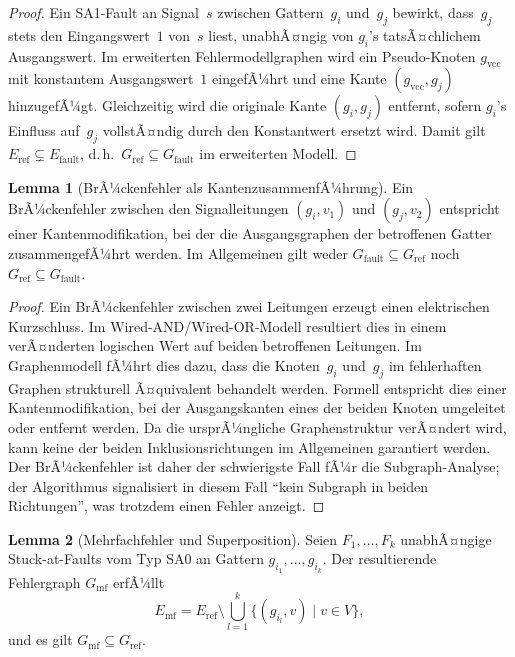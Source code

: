 ﻿\documentclass[a4paper,12pt]{article}
\theoremstyle{definition}
\newtheorem{lemma}{Lemma}
\begin{document}
\begin{proof}
  Ein SA1-Fault an Signal~$s$ zwischen Gattern~$g_i$ und~$g_j$ bewirkt,
  dass~$g_j$ stets den Eingangswert~$1$ von~$s$ liest, unabhÃ¤ngig von
  $g_i$'s tatsÃ¤chlichem Ausgangswert.
  Im erweiterten Fehlermodellgraphen wird ein Pseudo-Knoten
  $g_{\mathrm{vcc}}$ mit konstantem Ausgangswert~$1$ eingefÃ¼hrt und
  eine Kante $(g_{\mathrm{vcc}}, g_j)$ hinzugefÃ¼gt.
  Gleichzeitig wird die originale Kante $(g_i, g_j)$ entfernt, sofern
  $g_i$'s Einfluss auf~$g_j$ vollstÃ¤ndig durch den Konstantwert ersetzt
  wird.
  Damit gilt $E_{\mathrm{ref}} \subsetneq E_{\mathrm{fault}}$, d.\,h.\
  $G_{\mathrm{ref}} \subseteq G_{\mathrm{fault}}$ im erweiterten Modell.
\end{proof}

\begin{lemma}[BrÃ¼ckenfehler als KantenzusammenfÃ¼hrung]
  \label{lem:bridge_edge}
  Ein BrÃ¼ckenfehler zwischen den Signalleitungen $(g_i, v_1)$ und
  $(g_j, v_2)$ entspricht einer Kantenmodifikation, bei der die
  Ausgangsgraphen der betroffenen Gatter zusammengefÃ¼hrt werden.
  Im Allgemeinen gilt weder $G_{\mathrm{fault}} \subseteq G_{\mathrm{ref}}$
  noch $G_{\mathrm{ref}} \subseteq G_{\mathrm{fault}}$.
\end{lemma}

\begin{proof}
  Ein BrÃ¼ckenfehler zwischen zwei Leitungen erzeugt einen elektrischen
  Kurzschluss.
  Im Wired-AND/Wired-OR-Modell resultiert dies in einem verÃ¤nderten
  logischen Wert auf beiden betroffenen Leitungen.
  Im Graphenmodell fÃ¼hrt dies dazu, dass die Knoten~$g_i$ und~$g_j$
  im fehlerhaften Graphen strukturell Ã¤quivalent behandelt werden.
  Formell entspricht dies einer Kantenmodifikation, bei der
  Ausgangskanten eines der beiden Knoten umgeleitet oder entfernt werden.
  Da die ursprÃ¼ngliche Graphenstruktur verÃ¤ndert wird, kann keine der
  beiden Inklusionsrichtungen im Allgemeinen garantiert werden.
  Der BrÃ¼ckenfehler ist daher der schwierigste Fall fÃ¼r die
  Subgraph-Analyse; der Algorithmus signalisiert in diesem Fall
  ``kein Subgraph in beiden Richtungen'', was trotzdem einen Fehler
  anzeigt.
\end{proof}

\begin{lemma}[Mehrfachfehler und Superposition]
  \label{lem:mehrfach}
  Seien $F_1, \ldots, F_k$ unabhÃ¤ngige Stuck-at-Faults vom Typ SA0 an
  Gattern $g_{i_1}, \ldots, g_{i_k}$.
  Der resultierende Fehler\-graph $G_{\mathrm{mf}}$ erfÃ¼llt
  \[
    E_{\mathrm{mf}}
    = E_{\mathrm{ref}}
      \setminus \bigcup_{l=1}^{k} \{(g_{i_l}, v) \mid v \in V\},
  \]
  und es gilt $G_{\mathrm{mf}} \subseteq G_{\mathrm{ref}}$.
\end{lemma}
\end{document}
